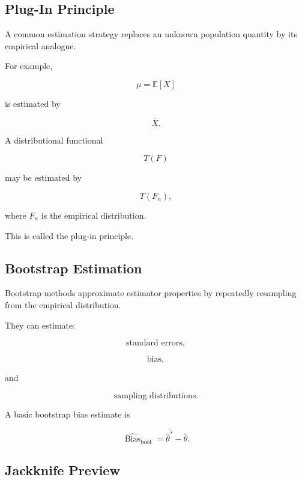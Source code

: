 \subsection{Plug-In Principle}
\label{subsec:plugin-principle}

A common estimation strategy replaces an unknown population quantity by
its empirical analogue.

For example,

\[
\mu
=
\mathbb{E}[X]
\]

is estimated by

\[
\overline{X}.
\]

A distributional functional

\[
T(F)
\]

may be estimated by

\[
\boxed{
T(F_n),
}
\]

where \(F_n\) is the empirical distribution.

This is called the plug-in principle.

\subsection{Bootstrap Estimation}
\label{subsec:bootstrap-estimation}

Bootstrap methods approximate estimator properties by repeatedly
resampling from the empirical distribution.

They can estimate:

\[
\boxed{
\text{standard errors},
}
\]

\[
\boxed{
\text{bias},
}
\]

and

\[
\boxed{
\text{sampling distributions}.
}
\]

A basic bootstrap bias estimate is

\[
\boxed{
\widehat{\operatorname{Bias}}_{\text{boot}}
=
\overline{\widehat{\theta}^*}
-
\widehat{\theta}.
}
\]

\subsection{Jackknife Preview}
\label{subsec:jackknife-preview}


